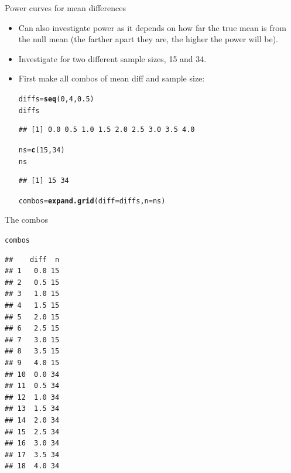 \documentclass[unknownkeysallowed]{beamer}\usepackage[]{graphicx}\usepackage[]{color}
\makeatletter
\newcommand{\hlnum}[1]{\textcolor[rgb]{0.686,0.059,0.569}{#1}}%
\newcommand{\hlstd}[1]{\textcolor[rgb]{0.345,0.345,0.345}{#1}}%
\newcommand{\hlkwb}[1]{\textcolor[rgb]{0.69,0.353,0.396}{#1}}%
\newcommand{\hlkwc}[1]{\textcolor[rgb]{0.333,0.667,0.333}{#1}}%
\newcommand{\hlkwd}[1]{\textcolor[rgb]{0.737,0.353,0.396}{\textbf{#1}}}%
\newenvironment{kframe}{%
 \def\at@end@of@kframe{}%
 \ifinner\ifhmode%
  \def\at@end@of@kframe{\end{minipage}}%
  \begin{minipage}{\columnwidth}%
 \fi\fi%
 \def\FrameCommand##1{\hskip\@totalleftmargin \hskip-\fboxsep
 \colorbox{shadecolor}{##1}\hskip-\fboxsep
     \hskip-\linewidth \hskip-\@totalleftmargin \hskip\columnwidth}%
 \MakeFramed {\advance\hsize-\width
   \@totalleftmargin\z@ \linewidth\hsize
   \@setminipage}}%
 {\par\unskip\endMakeFramed%
 \at@end@of@kframe}
\newenvironment{knitrout}{}{} %
\makeatother
\begin{document}
\begin{frame}[fragile]{Power curves for mean differences}
  
  \begin{itemize}
  \item Can also investigate power as it depends on how far the true
    mean is from the null mean (the farther apart they are, the higher
    the power will be).
  \item Investigate for two different sample sizes, 15 and 34.
  \item First make all combos of mean diff and sample size:
\begin{knitrout}
\color{fgcolor}\begin{kframe}
\begin{alltt}
\hlstd{diffs}\hlkwb{=}\hlkwd{seq}\hlstd{(}\hlnum{0}\hlstd{,}\hlnum{4}\hlstd{,}\hlnum{0.5}\hlstd{)}
\hlstd{diffs}
\end{alltt}
\begin{verbatim}
## [1] 0.0 0.5 1.0 1.5 2.0 2.5 3.0 3.5 4.0
\end{verbatim}
\begin{alltt}
\hlstd{ns}\hlkwb{=}\hlkwd{c}\hlstd{(}\hlnum{15}\hlstd{,}\hlnum{34}\hlstd{)}
\hlstd{ns}
\end{alltt}
\begin{verbatim}
## [1] 15 34
\end{verbatim}
\begin{alltt}
\hlstd{combos}\hlkwb{=}\hlkwd{expand.grid}\hlstd{(}\hlkwc{diff}\hlstd{=diffs,}\hlkwc{n}\hlstd{=ns)}
\end{alltt}
\end{kframe}
\end{knitrout}
    
  \end{itemize}
  
\end{frame}

\begin{frame}[fragile]{The combos}
\begin{knitrout}
\color{fgcolor}\begin{kframe}
\begin{alltt}
\hlstd{combos}
\end{alltt}
\begin{verbatim}
##    diff  n
## 1   0.0 15
## 2   0.5 15
## 3   1.0 15
## 4   1.5 15
## 5   2.0 15
## 6   2.5 15
## 7   3.0 15
## 8   3.5 15
## 9   4.0 15
## 10  0.0 34
## 11  0.5 34
## 12  1.0 34
## 13  1.5 34
## 14  2.0 34
## 15  2.5 34
## 16  3.0 34
## 17  3.5 34
## 18  4.0 34
\end{verbatim}
\end{kframe}
\end{knitrout}
\end{frame}
\end{document}
